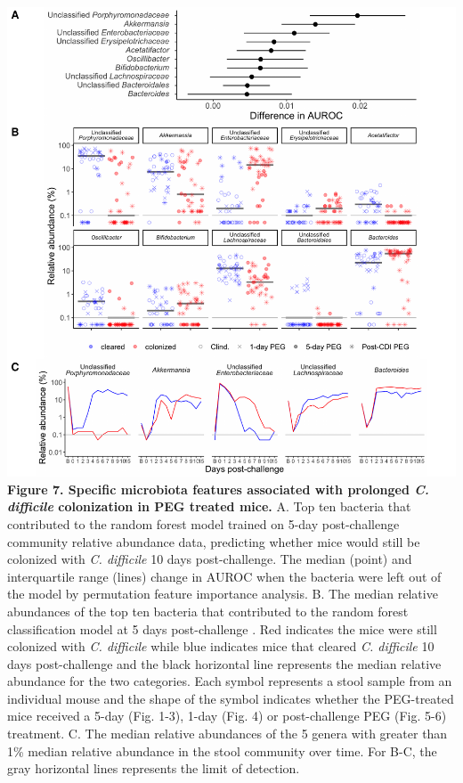\documentclass[
  11pt,
]{article}
\begin{document}
\newpage

\includegraphics{figure_7.pdf} \textbf{Figure 7. Specific microbiota
features associated with prolonged \emph{C. difficile} colonization in
PEG treated mice.} A. Top ten bacteria that contributed to the random
forest model trained on 5-day post-challenge community relative
abundance data, predicting whether mice would still be colonized with
\emph{C. difficile} 10 days post-challenge. The median (point) and
interquartile range (lines) change in AUROC when the bacteria were left
out of the model by permutation feature importance analysis. B. The
median relative abundances of the top ten bacteria that contributed to
the random forest classification model at 5 days post-challenge . Red
indicates the mice were still colonized with \emph{C. difficile} while
blue indicates mice that cleared \emph{C. difficile} 10 days
post-challenge and the black horizontal line represents the median
relative abundance for the two categories. Each symbol represents a
stool sample from an individual mouse and the shape of the symbol
indicates whether the PEG-treated mice received a 5-day (Fig. 1-3),
1-day (Fig. 4) or post-challenge PEG (Fig. 5-6) treatment. C. The median
relative abundances of the 5 genera with greater than 1\% median
relative abundance in the stool community over time. For B-C, the gray
horizontal lines represents the limit of detection. \newpage
\end{document}
